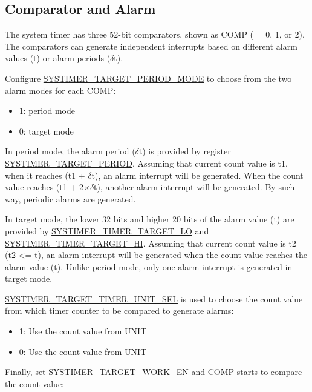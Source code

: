 \documentclass[main\_\_EN.tex]{subfiles}
\begin{document}
\subsection{Comparator and Alarm}
The system timer has three 52-bit comparators, shown as COMP ( = 0, 1, or 2). The comparators can generate independent interrupts based on different alarm values (t) or alarm periods ($\delta$t).

Configure \hyperref[fielddesc:SYSTIMERTARGET0PERIODMODE]{SYSTIMER\_TARGET\_PERIOD\_MODE} to choose from the two alarm modes for each COMP:
\begin{itemize}
    \item 1: period mode
    \item 0: target mode
\end{itemize}

In period mode, the alarm period ($\delta$t) is provided by register \hyperref[fielddesc:SYSTIMERTARGET2PERIOD]{SYSTIMER\_TARGET\_PERIOD}. Assuming that current count value is t1, when it reaches (t1 + $\delta$t), an alarm interrupt will be generated. When the count value reaches (t1 + 2×$\delta$t), another alarm interrupt will be generated. By such way, periodic alarms are generated.

In target mode, the lower 32 bits and higher 20 bits of the alarm value (t) are provided by  \hyperref[fielddesc:SYSTIMERTIMERTARGET0LO]{SYSTIMER\_TIMER\_TARGET\_LO} and \hyperref[fielddesc:SYSTIMERTIMERTARGET0HI]{SYSTIMER\_TIMER\_TARGET\_HI}. Assuming that current count value is t2 (t2 <= t), an alarm interrupt will be generated when the count value reaches the alarm value (t). Unlike period mode, only one alarm interrupt is generated in target mode.

\hyperref[fielddesc:SYSTIMERTARGET0TIMERUNITSEL]{SYSTIMER\_TARGET\_TIMER\_UNIT\_SEL} is used to choose the count value from which timer counter to be compared to generate alarms:

\begin{itemize}
        \item 1: Use the count value from UNIT
        \item 0: Use the count value from UNIT
\end{itemize}

Finally, set \hyperref[fielddesc:SYSTIMERTARGET0WORKEN]{SYSTIMER\_TARGET\_WORK\_EN} and COMP starts to compare the count value:
\end{document}
